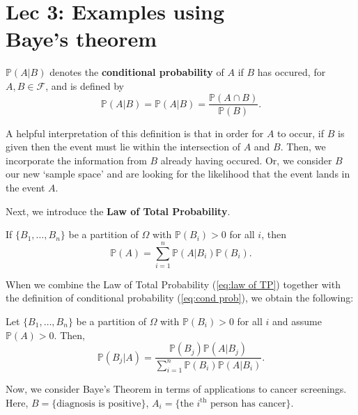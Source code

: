 \chapter[Lec 3: Examples using Baye's theorem]{Lec 3: Examples using\\Baye's theorem}


\begin{definition}\label{defn:cond prob}
    \(\mathbb{P}(A|B)\) denotes the \textbf{conditional probability} of \(A\) if \(B\) has occured, 
    for \(A,B \in \mathcal{F}\), and is defined by 
    \begin{equation}\label{eq:cond prob}
        \mathbb{P}(A|B) = \mathbb{P}(A|B) = \frac{\mathbb{P}(A\cap B)}{\mathbb{P}(B)}.
    \end{equation}
\end{definition}

A helpful interpretation of this definition is that in order for \(A\) to occur, if \(B\) is given then the event must 
lie within the intersection of \(A\) and \(B\). Then, we incorporate the information from \(B\) already having occured. 
Or, we consider \(B\) our new `sample space' and are looking for the likelihood that the event lands in the event \(A\). 

\bigskip

Next, we introduce the \textbf{Law of Total Probability}. 

\begin{theorem}\label{thm:law of TP}
    If \(\{B_1,\ldots,B_n\}\) be a partition of \(\Omega\) with \(\mathbb{P}(B_i)>0\) for all \(i\), then
    \begin{equation}\label{eq:law of TP}
        \mathbb{P}(A)= \sum_{i=1}^n \mathbb{P}(A|B_i)\mathbb{P}(B_i).
    \end{equation}
\end{theorem}

When we combine the Law of Total Probability (\cref{eq:law of TP}) together with the definition of conditional probability (\cref{eq:cond prob}), we obtain the following:

\begin{theorem}\label{thm:Baye's}
    Let \(\{B_1,\ldots,B_n\}\) be a partition of \(\Omega\) with \(\mathbb{P}(B_i)>0\) for all \(i\) and assume \(\mathbb{P}(A)>0\). Then, 
    \begin{equation}\label{eq:Baye's}
        \mathbb{P}(B_j|A) = \frac{\mathbb{P}(B_j)\mathbb{P}(A|B_j)}{\sum_{i=1}^n \mathbb{P}(B_i)\mathbb{P}(A|B_i)}.
    \end{equation}
\end{theorem}

Now, we consider Baye's Theorem in terms of applications to cancer screenings. 
Here, \(B = \{\text{diagnosis is positive}\}\), \(A_i = \{\text{the }i^{\text{th}} \text{ person has cancer}\}\). 
